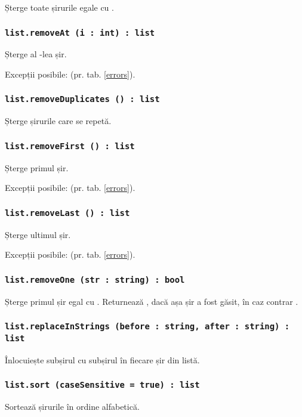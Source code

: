 Șterge toate șirurile egale cu .

\subsubsection{\lstinline|list.removeAt (i : int) : list|}

Șterge al -lea șir.

Excepții posibile:  (pr. tab. \ref{errors}).

\subsubsection{\lstinline|list.removeDuplicates () : list|}

Șterge șirurile care se repetă.

\subsubsection{\lstinline|list.removeFirst () : list|}

Șterge primul șir.

Excepții posibile:  (pr. tab. \ref{errors}).

\subsubsection{\lstinline|list.removeLast () : list|}

Șterge ultimul șir.

Excepții posibile:  (pr. tab. \ref{errors}).

\subsubsection{\lstinline|list.removeOne (str : string) : bool|}

Șterge primul șir egal cu . Returnează \true, dacă așa șir a fost găsit, în caz contrar \false.

\subsubsection{\lstinline|list.replaceInStrings (before : string, after : string) : list|}

Înlocuiește subșirul  cu subșirul  în fiecare șir din listă.

\subsubsection{\lstinline|list.sort (caseSensitive = true) : list|}

Sortează șirurile în ordine alfabetică.

